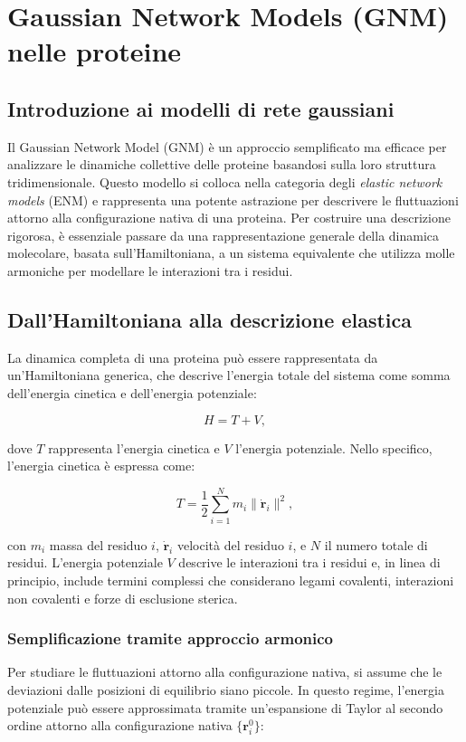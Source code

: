\documentclass[Lau,binding=0.6cm,oneside,noexaminfo]{sapthesis}
\begin{document}
\chapter{Gaussian Network Models (GNM) nelle proteine}

\section*{Introduzione ai modelli di rete gaussiani}
Il Gaussian Network Model (GNM) è un approccio semplificato ma efficace per analizzare le dinamiche collettive delle proteine basandosi sulla loro struttura tridimensionale. Questo modello si colloca nella categoria degli \textit{elastic network models} (ENM) e rappresenta una potente astrazione per descrivere le fluttuazioni attorno alla configurazione nativa di una proteina. Per costruire una descrizione rigorosa, è essenziale passare da una rappresentazione generale della dinamica molecolare, basata sull'Hamiltoniana, a un sistema equivalente che utilizza molle armoniche per modellare le interazioni tra i residui.

\section{Dall’Hamiltoniana alla descrizione elastica}
La dinamica completa di una proteina può essere rappresentata da un'Hamiltoniana generica, che descrive l'energia totale del sistema come somma dell'energia cinetica e dell'energia potenziale:

\begin{equation}
H = T + V,
\end{equation}

dove $T$ rappresenta l'energia cinetica e $V$ l'energia potenziale. Nello specifico, l'energia cinetica è espressa come:

\begin{equation}
T = \frac{1}{2} \sum_{i=1}^{N} m_i \|\dot{\mathbf{r}}_i\|^2,
\end{equation}

con $m_i$ massa del residuo $i$, $\dot{\mathbf{r}}_i$ velocità del residuo $i$, e $N$ il numero totale di residui. L'energia potenziale $V$ descrive le interazioni tra i residui e, in linea di principio, include termini complessi che considerano legami covalenti, interazioni non covalenti e forze di esclusione sterica.

\subsection*{Semplificazione tramite approccio armonico}
Per studiare le fluttuazioni attorno alla configurazione nativa, si assume che le deviazioni dalle posizioni di equilibrio siano piccole. In questo regime, l'energia potenziale può essere approssimata tramite un'espansione di Taylor al secondo ordine attorno alla configurazione nativa $\{\mathbf{r}_i^0\}$:
\end{document}
